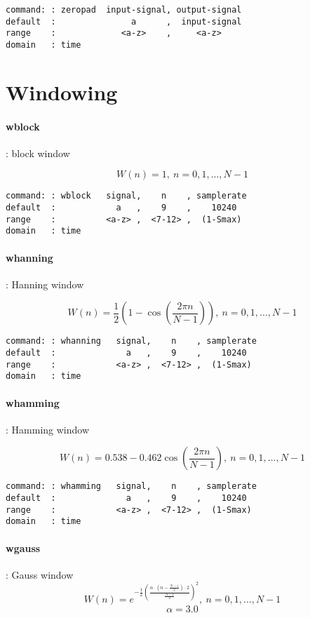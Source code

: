 \documentclass{report}
\newcommand{\bc}{\scriptsize}
\newcommand{\ec}{\normalsize}
\begin{document}
\bc
\begin{verbatim}
command: : zeropad  input-signal, output-signal
default  :               a      ,  input-signal
range    :             <a-z>    ,     <a-z>
domain   : time
\end{verbatim}
\ec

\section{Windowing}

\paragraph{wblock}: block window

\[ W(n) = 1,~ n = 0,1,...,N-1 \]

\bc
\begin{verbatim}
command: : wblock   signal,    n    , samplerate
default  :            a   ,    9    ,    10240
range    :          <a-z> ,  <7-12> ,  (1-Smax)
domain   : time
\end{verbatim}
\ec

\paragraph{whanning}: Hanning window

\[ W(n) = \frac{1}{2}\left( 1- \cos (\frac{2\pi n}{N-1}) \right) ,~ n = 0,1,...,N-1 \]

\bc
\begin{verbatim}
command: : whanning   signal,    n    , samplerate
default  :              a   ,    9    ,    10240
range    :            <a-z> ,  <7-12> ,  (1-Smax)
domain   : time
\end{verbatim}
\ec

\paragraph{whamming}: Hamming window

\[W(n) =  0.538 - 0.462 \cos (\frac{2\pi n}{N-1}) ,~ n = 0,1,...,N-1 \]

\bc
\begin{verbatim}
command: : whamming   signal,    n    , samplerate
default  :              a   ,    9    ,    10240
range    :            <a-z> ,  <7-12> ,  (1-Smax)
domain   : time
\end{verbatim}
\ec

\paragraph{wgauss}: Gauss window
\large
\[W(n) = e^{- \frac{1}{2} \left( \frac{\alpha \cdot (n - \frac{N-1}{2}) \cdot 2 }{\frac{N-1}{2}} \right)^{2}},~ n = 0,1,...,N-1 \]
\normalsize
\[ \alpha = 3.0 \]
\end{document}
